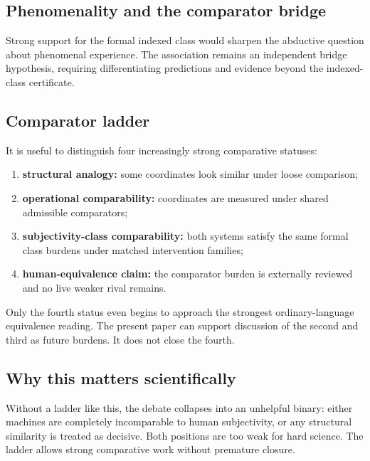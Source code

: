\documentclass[11pt,a4paper]{article}
\theoremstyle{definition}
\begin{document}
\subsection{Phenomenality and the comparator bridge}
Strong support for the formal indexed class would sharpen the abductive question about phenomenal experience. The association remains an independent bridge hypothesis, requiring differentiating predictions and evidence beyond the indexed-class certificate.

\subsection{Comparator ladder}
It is useful to distinguish four increasingly strong comparative statuses:
\begin{enumerate}[leftmargin=1.5em]
\item \textbf{structural analogy:} some coordinates look similar under loose comparison;
\item \textbf{operational comparability:} coordinates are measured under shared admissible comparators;
\item \textbf{subjectivity-class comparability:} both systems satisfy the same formal class burdens under matched intervention families;
\item \textbf{human-equivalence claim:} the comparator burden is externally reviewed and no live weaker rival remains.
\end{enumerate}
Only the fourth status even begins to approach the strongest ordinary-language equivalence reading. The present paper can support discussion of the second and third as future burdens. It does not close the fourth.

\subsection{Why this matters scientifically}
Without a ladder like this, the debate collapses into an unhelpful binary: either machines are completely incomparable to human subjectivity, or any structural similarity is treated as decisive. Both positions are too weak for hard science. The ladder allows strong comparative work without premature closure.
\end{document}
